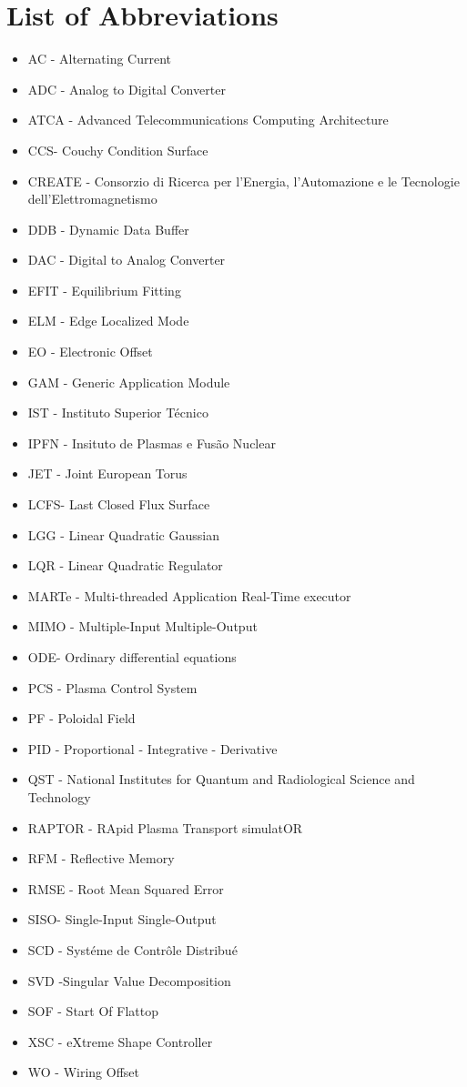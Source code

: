 \chapter*{List of Abbreviations}

\begin{itemize}
\item AC - Alternating Current
\item ADC - Analog to Digital Converter
\item ATCA -  Advanced Telecommunications Computing Architecture 
\item CCS- Couchy Condition Surface 
\item CREATE - Consorzio di Ricerca per l'Energia, l'Automazione e le Tecnologie dell'Elettromagnetismo
\item DDB - Dynamic Data Buffer
\item DAC - Digital to Analog Converter
\item EFIT - Equilibrium Fitting
\item  ELM - Edge Localized Mode
\item EO - Electronic Offset
\item GAM - Generic Application Module 
\item IST - Instituto Superior Técnico
\item IPFN - Insituto de Plasmas e Fus\~ao Nuclear
\item JET - Joint European Torus
\item LCFS- Last Closed Flux Surface
\item LGG - Linear Quadratic Gaussian
\item LQR - Linear Quadratic Regulator
\item MARTe - Multi-threaded Application Real-Time executor
\item MIMO - Multiple-Input Multiple-Output
\item ODE- Ordinary differential equations
\item PCS - Plasma Control System
\item PF - Poloidal Field 
\item PID - Proportional - Integrative - Derivative
\item QST -  National Institutes for Quantum and Radiological Science and Technology 
\item RAPTOR - RApid Plasma Transport simulatOR
\item RFM - Reflective Memory
\item RMSE - Root Mean Squared Error
\item SISO- Single-Input Single-Output
\item SCD - Syst\'eme de Contr\^ole Distribu\'e
\item  SVD -Singular Value Decomposition
\item SOF - Start Of Flattop
\item XSC - eXtreme Shape Controller
\item WO - Wiring Offset
\end{itemize}


